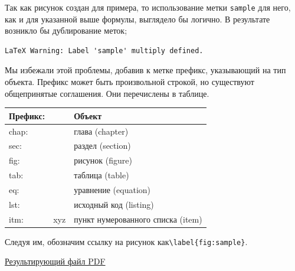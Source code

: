 \documentclass[a4paper,12pt]{article}
\begin{document}
Так как рисунок создан для примера, то использование метки \verb|sample| для него, как и для указанной выше формулы, выглядело бы логично. В результате возникло бы дублирование меток;
\begin{verbatim}
LaTeX Warning: Label 'sample' multiply defined.
\end{verbatim}

Мы избежали этой проблемы, добавив к метке префикс, указывающий на тип объекта. Префикс может быть произвольной строкой, но существуют общепринятые соглашения. Они перечислены в таблице.

\begin{table}[h]
    \centering
    \begin{tabular}{|l|l|l|}
        \hline
        Префикс: &     & Объект                            \\
        \hline
        chap:    &     & глава (chapter)                   \\
        \hline
        sec:     &     & раздел (section)                  \\
        \hline
        fig:     &     & рисунок (figure)                  \\
        \hline
        tab:     &     & таблица (table)                   \\
        \hline
        eq:      &     & уравнение (equation)              \\
        \hline
        lst:     &     & исходный код (listing)            \\
        \hline
        itm:     & xyz & пункт нумерованного списка (item) \\
        \hline
    \end{tabular}
\end{table}


Следуя им, обозначим ссылку на рисунок как\linebreak \verb|\label{fig:sample}|.

\hfill

\href{https://raw.githubusercontent.com/smartbyter/docstest/master/example.pdf}{Результирующий файл PDF}
\end{document}
